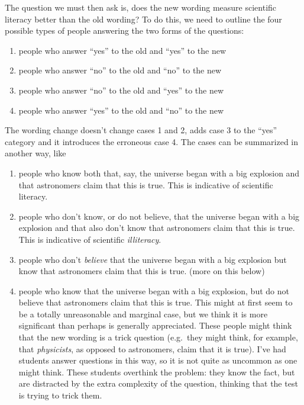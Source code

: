 The question we must then ask is, does the new wording measure scientific literacy better than the old wording? To do this, we need to outline the four possible types of people answering the two forms of the questions:

\begin{enumerate}
\def\labelenumi{\arabic{enumi}.}
\itemsep1pt\parskip0pt
\item
  people who answer ``yes'' to the old and ``yes'' to the new
\item
  people who answer ``no'' to the old and ``no'' to the new
\item
  people who answer ``no'' to the old and ``yes'' to the new
\item
  people who answer ``yes'' to the old and ``no'' to the new
\end{enumerate}

The wording change doesn't change cases 1 and 2, adds case 3 to the
``yes'' category and it introduces the erroneous case 4. The cases can
be summarized in another way, like

\begin{enumerate}
\def\labelenumi{\arabic{enumi}.}
\itemsep1pt\parskip0pt
\item
  people who know both that, say, the universe began with a big
  explosion and that astronomers claim that this is true. This is
  indicative of scientific literacy.
\item
  people who don't know, or do not believe, that the universe began with
  a big explosion and that also don't know that astronomers claim that this
  is true. This is indicative of scientific \emph{illiteracy}.
\item
  people who don't \emph{believe} that the universe began with a big
  explosion but know that astronomers claim that this is true. (more on
  this below)
\item
  people who know that the universe began with a big explosion, but do
  not believe that astronomers claim that this is true. This might at
  first seem to be a totally unreasonable and marginal case, but we think
  it is more significant than perhaps is generally appreciated. These
  people might think that the new wording is a trick question (e.g.~they
  might think, for example, that \emph{physicists}, as opposed to astronomers, claim
  that it is true). I've had students answer questions in this way, so
  it is not quite as uncommon as one might think. These students
  overthink the problem: they know the fact, but are distracted by the
  extra complexity of the question, thinking that the test is trying to
  trick them.
\end{enumerate}

